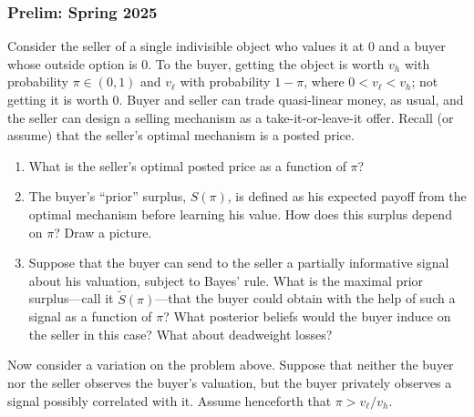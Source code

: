 \documentclass[11pt,english]{article}
\begin{document}
\subsubsection{Prelim: Spring 2025}\label{Rahman Prelim: Spring 2025}
Consider the seller of a single indivisible object who values it at 0 and a
buyer whose outside option is 0. To the buyer, getting the object is worth
$v_h$ with probability $\pi \in (0,1)$ and $v_\ell$ with probability $1 -
\pi$, where $0 < v_\ell < v_h$; not getting it is worth 0. Buyer and seller
can trade quasi-linear money, as usual, and the seller can design a selling
mechanism as a take-it-or-leave-it offer. Recall (or assume) that the seller's
optimal mechanism is a posted price.
 
\begin{enumerate}
    \item[(1)] What is the seller's optimal posted price as a function of $\pi$?
    \begin{solution}
 
    \end{solution}
 
    \item[(2)] The buyer's ``prior'' surplus, $S(\pi)$, is defined as his
        expected payoff from the optimal mechanism before learning his value.
        How does this surplus depend on $\pi$? Draw a picture.
    \begin{solution}
 
    \end{solution}
 
    \item[(3)] Suppose that the buyer can send to the seller a partially
        informative signal about his valuation, subject to Bayes' rule. What is
        the maximal prior surplus---call it $\tilde{S}(\pi)$---that the buyer
        could obtain with the help of such a signal as a function of $\pi$?
        What posterior beliefs would the buyer induce on the seller in this
        case? What about deadweight losses?
    \begin{solution}
 
    \end{solution}
\end{enumerate}
 
Now consider a variation on the problem above. Suppose that neither the buyer
nor the seller observes the buyer's valuation, but the buyer privately observes
a signal possibly correlated with it. Assume henceforth that $\pi > v_\ell /
v_h$.
 
\end{document}
